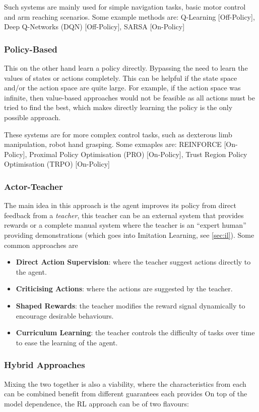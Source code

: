     Such systems are mainly used for simple navigation tasks, basic motor control and arm reaching scenarios. Some example methods are: Q-Learning [Off-Policy], Deep Q-Networks (DQN) [Off-Policy], SARSA [On-Policy] 

  \subsubsection{Policy-Based}
  This on the other hand learn a policy directly. Bypassing the need to learn the values of states or actions completely. This can be helpful if the state space and/or the action space are quite large. For example, if the action space was infinite, then value-based approaches would not be feasible as all actions must be tried to find the best, which makes directly learning the policy is the only possible approach.

  These systems are for more complex control tasks, such as dexterous limb manipulation, robot hand grasping. Some exmaples are: REINFORCE [On-Policy], Proximal Policy Optimisation (PRO) [On-Policy], Trust Region Policy Optimisation (TRPO) [On-Policy] 

  \subsubsection{Actor-Teacher} 
  The main idea in this approach is the agent improves its policy from direct feedback from a \emph{teacher}, this teacher can be an external system that provides rewards or a complete manual system where the teacher is an ``expert human'' providing demonstrations (which goes into Imitation Learning, see \ref{sec:il}). Some common approaches are
  \begin{itemize}
    \item \textbf{Direct Action Supervision}: where the teacher suggest actions directly to the agent.
    \item \textbf{Criticising Actions}: where the actions are suggested by the teacher.
    \item \textbf{Shaped Rewards}: the teacher modifies the reward signal dynamically to encourage desirable behaviours.
    \item \textbf{Curriculum Learning}: the teacher controls the difficulty of tasks over time to ease the learning of the agent.
  \end{itemize}
  
  \subsubsection{Hybrid Approaches}
  Mixing the two together is also a viability, where the characteristics from each can be combined benefit from different guarantees each provides \cite{qu2020combiningmodelbasedmodelfreemethods}
  On top of the model dependence, the RL approach can be of two flavours:

